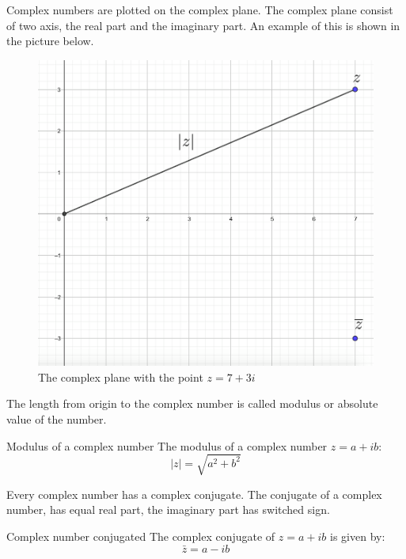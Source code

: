 Complex numbers are plotted on the complex plane. The complex plane consist of two axis, the real part and the imaginary part. An example of this is shown in the picture below.
\begin{figure}[H]
\centering
\includegraphics[scale=0.25]{fig/img/complex_plan}
\caption{The complex plane with the point $z=7+3i$}
\end{figure}
\noindent
The length from origin to the complex number is called modulus or absolute value of the number.
\begin{definition}{Modulus of a complex number}{}
The modulus of a complex number $z=a+ib$:
$$\mid z\mid=\sqrt{a^2+b^2}$$
\end{definition}
\noindent
Every complex number has a complex conjugate. The conjugate of a complex number, has equal real part, the imaginary part has switched sign.
\begin{definition}{Complex number conjugated}{}
The complex conjugate of $z=a+ib$ is given by:
$$\bar{z}=a-ib$$
\end{definition} 

